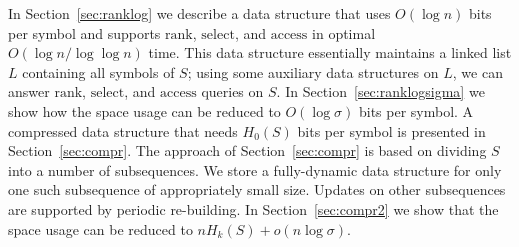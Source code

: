 \documentclass[11pt]{article}\usepackage{fullpage}
\def\idrm#1{\ensuremath{\mathrm{#1}}}
\newcommand{\ra}{\idrm{rank}}
\newcommand{\sel}{\idrm{select}}
\newcommand{\acc}{\idrm{access}}
\begin{document}
\begin{table}[tb]
  \centering
{}
  \caption{Previous and New Results for Fully-Dynamic Sequences. The rightmost column indicates whether updates are amortized (A) or worst-case (W). We use notation $\lambda=\log n/\log\log n$ in this table.}
  \label{tab:ranksel}
\end{table}


In Section~\ref{sec:ranklog} we describe a data structure that uses $O(\log n)$ bits per symbol and supports $\ra$, $\sel$, and $\acc$ in optimal $O(\log n/\log\log n)$ time. This data structure essentially maintains a linked list $L$ containing 
all symbols of $S$; using some auxiliary data structures on $L$, we can answer  $\ra$, $\sel$, and $\acc$ queries on $S$. 
In Section~\ref{sec:ranklogsigma} we show how the space usage can be reduced to $O(\log \sigma)$ bits per symbol. A compressed data structure that needs $H_0(S)$ bits per symbol is presented in Section~\ref{sec:compr}.  The approach of Section~\ref{sec:compr} is based on dividing $S$ into a number of subsequences. We store a fully-dynamic data structure for only one such subsequence of appropriately small size.  Updates on other subsequences are supported by periodic re-building.
 In Section~\ref{sec:compr2} we show that the space usage can be reduced to $nH_k(S)+o(n\log\sigma)$. 
\end{document}
